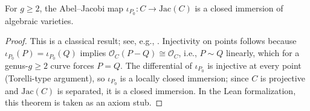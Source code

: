 \begin{theorem}
  \label{thm:abel_jacobi_closed_immersion}
  For \(g \ge 2\), the Abel--Jacobi map \(\iota_{P_0} \colon C \to \mathrm{Jac}(C)\)
  is a closed immersion of algebraic varieties.
\end{theorem}

\begin{proof}
  This is a classical result; see, e.g., \cite[Chapter~IV, Theorem~4.2]{ACG:Curve}.
  Injectivity on points follows because \(\iota_{P_0}(P) = \iota_{P_0}(Q)\) implies
  \(\mathcal{O}_C(P - Q) \cong \mathcal{O}_C\), i.e., \(P \sim Q\) linearly, which
  for a genus-\(g \ge 2\) curve forces \(P = Q\).
  The differential of \(\iota_{P_0}\) is injective at every point (Torelli-type
  argument), so \(\iota_{P_0}\) is a locally closed immersion; since \(C\) is
  projective and \(\mathrm{Jac}(C)\) is separated, it is a closed immersion.
  In the Lean formalization, this theorem is taken as an axiom stub.
\end{proof}
